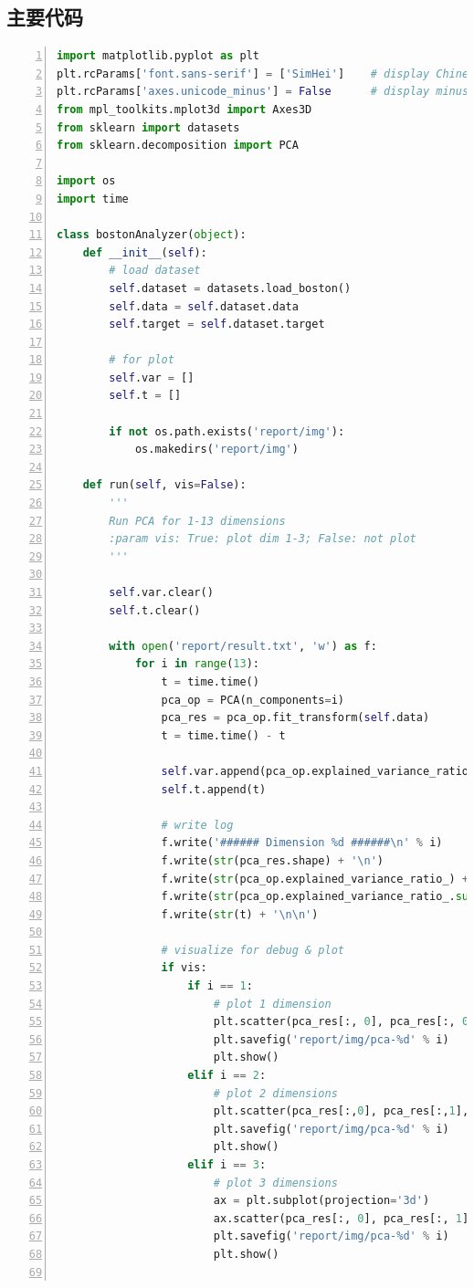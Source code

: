 \documentclass[12pt,a4paper]{article}
\theoremstyle{definition}
\begin{document}
\begin{appendix}
	\subsection{主要代码}
	\label{apd:code}
	
	\begin{lstlisting}[language=Python,
	numbers=left,
	keywordstyle=\color{blue!70},
	frame=shadowbox,
	breaklines=True]
import matplotlib.pyplot as plt
plt.rcParams['font.sans-serif'] = ['SimHei']    # display Chinese
plt.rcParams['axes.unicode_minus'] = False      # display minus sign
from mpl_toolkits.mplot3d import Axes3D
from sklearn import datasets
from sklearn.decomposition import PCA

import os
import time

class bostonAnalyzer(object):
    def __init__(self):
        # load dataset
        self.dataset = datasets.load_boston()
        self.data = self.dataset.data
        self.target = self.dataset.target
        
        # for plot
        self.var = []
        self.t = []

        if not os.path.exists('report/img'):
            os.makedirs('report/img')

    def run(self, vis=False):
        '''
        Run PCA for 1-13 dimensions
        :param vis: True: plot dim 1-3; False: not plot
        '''

        self.var.clear()
        self.t.clear()

        with open('report/result.txt', 'w') as f:
            for i in range(13):
                t = time.time()
                pca_op = PCA(n_components=i)
                pca_res = pca_op.fit_transform(self.data)
                t = time.time() - t

                self.var.append(pca_op.explained_variance_ratio_.sum())
                self.t.append(t)

                # write log
                f.write('###### Dimension %d ######\n' % i)
                f.write(str(pca_res.shape) + '\n')
                f.write(str(pca_op.explained_variance_ratio_) + '\n')
                f.write(str(pca_op.explained_variance_ratio_.sum()) + '\n')
                f.write(str(t) + '\n\n')

                # visualize for debug & plot
                if vis:
                    if i == 1:
                        # plot 1 dimension
                        plt.scatter(pca_res[:, 0], pca_res[:, 0], s=14, c=self.target)
                        plt.savefig('report/img/pca-%d' % i)
                        plt.show()
                    elif i == 2:
                        # plot 2 dimensions
                        plt.scatter(pca_res[:,0], pca_res[:,1], s=8, c=self.target)
                        plt.savefig('report/img/pca-%d' % i)
                        plt.show()
                    elif i == 3:
                        # plot 3 dimensions
                        ax = plt.subplot(projection='3d')
                        ax.scatter(pca_res[:, 0], pca_res[:, 1], pca_res[:, 2], s=8, c=self.target)
                        plt.savefig('report/img/pca-%d' % i)
                        plt.show()


\end{lstlisting}
\end{appendix}
\end{document}
